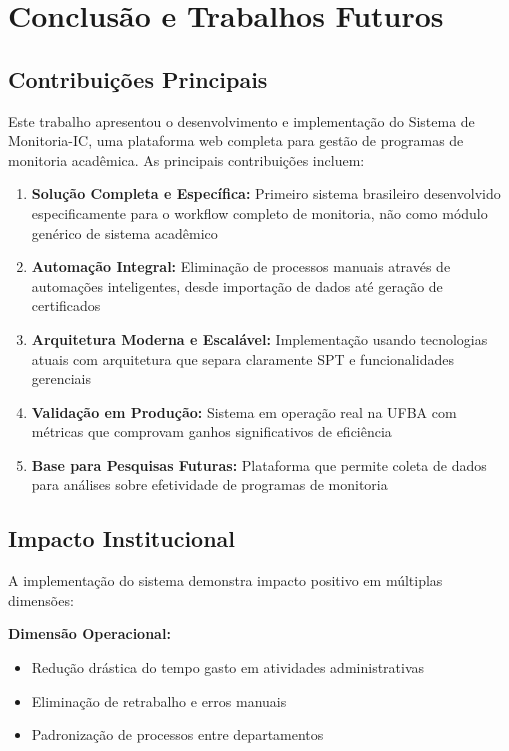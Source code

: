 \documentclass[portuguese]{sbc2025}%
\begin{document}
\section{Conclusão e Trabalhos Futuros}
\label{sec:conclusion}

\subsection{Contribuições Principais}

Este trabalho apresentou o desenvolvimento e implementação do Sistema de Monitoria-IC, uma plataforma web completa para gestão de programas de monitoria acadêmica. As principais contribuições incluem:

\begin{enumerate}
  \item \textbf{Solução Completa e Específica:} Primeiro sistema brasileiro desenvolvido especificamente para o workflow completo de monitoria, não como módulo genérico de sistema acadêmico

  \item \textbf{Automação Integral:} Eliminação de processos manuais através de automações inteligentes, desde importação de dados até geração de certificados

  \item \textbf{Arquitetura Moderna e Escalável:} Implementação usando tecnologias atuais com arquitetura que separa claramente SPT e funcionalidades gerenciais

  \item \textbf{Validação em Produção:} Sistema em operação real na UFBA com métricas que comprovam ganhos significativos de eficiência

  \item \textbf{Base para Pesquisas Futuras:} Plataforma que permite coleta de dados para análises sobre efetividade de programas de monitoria
\end{enumerate}

\subsection{Impacto Institucional}

A implementação do sistema demonstra impacto positivo em múltiplas dimensões:

\textbf{Dimensão Operacional:}
\begin{itemize}
  \item Redução drástica do tempo gasto em atividades administrativas
  \item Eliminação de retrabalho e erros manuais
  \item Padronização de processos entre departamentos
\end{itemize}
\end{document}
